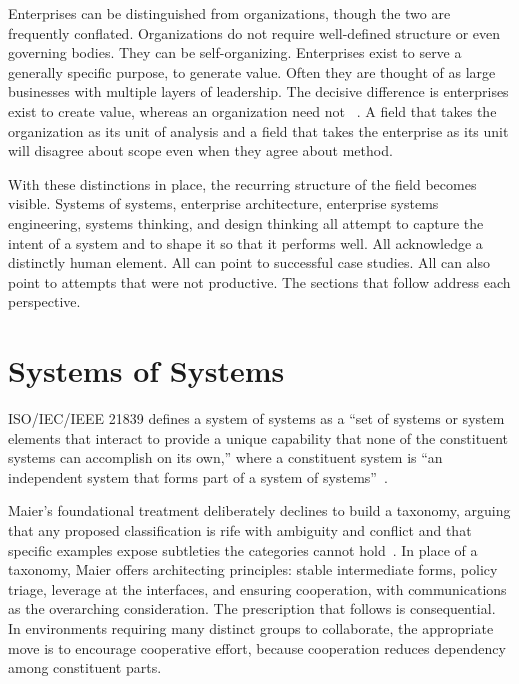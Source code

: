 \documentclass{csimq}
\begin{document}
Enterprises can be distinguished from organizations, though
the two are frequently conflated. Organizations do not require well-defined structure or even governing bodies. They can be self-organizing. Enterprises exist to serve a generally specific purpose, to generate value. Often they are thought of as large businesses with multiple layers of leadership. The decisive difference is enterprises exist to create value, whereas an organization need not
~\cite{sebok_ese2024,kotze2016}. A field that takes the organization as its
unit of analysis and a field that takes the enterprise as its unit will
disagree about scope even when they agree about method.

With these distinctions in place, the recurring structure of the field becomes
visible. Systems of systems, enterprise architecture, enterprise systems
engineering, systems thinking, and design thinking all attempt to capture the
intent of a system and to shape it so that it performs well. All acknowledge a
distinctly human element. All can point to successful case studies. All can also
point to attempts that were not productive.
The sections that follow address each perspective.

\section{Systems of Systems}
\label{sec:sos}

ISO/IEC/IEEE 21839 defines a system of systems as a ``set of systems or system
elements that interact to provide a unique capability that none of the
constituent systems can accomplish on its own,'' where a constituent system is
``an independent system that forms part of a system of systems''~\cite{iso21839}.

Maier's foundational treatment deliberately declines to build a taxonomy,
arguing that any proposed classification is rife with ambiguity and conflict and
that specific examples expose subtleties the categories cannot
hold~\cite{maier1998}. In place of a taxonomy, Maier offers architecting
principles: stable intermediate forms, policy triage, leverage at the
interfaces, and ensuring cooperation, with communications as the overarching
consideration. The prescription that follows is consequential. In environments
requiring many distinct groups to collaborate, the appropriate move is to
encourage cooperative effort, because cooperation reduces dependency among
constituent parts.
\end{document}
